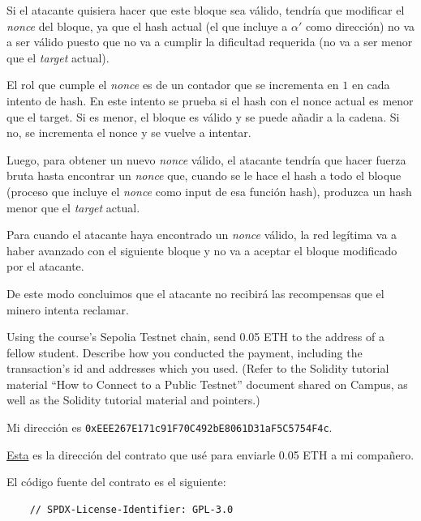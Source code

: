 \documentclass[12pt,addpoints,answers]{exam}
\begin{document}
\begin{questions}
\begin{solution}
    Si el atacante quisiera hacer que este bloque sea válido, tendría que modificar el
    \textit{nonce} del bloque, ya que el hash actual (el que incluye a $\alpha'$ como dirección) 
    no va a ser válido puesto que no va a cumplir la dificultad requerida
    (no va a ser menor que el \textit{target} actual).
        
    El rol que cumple el \textit{nonce} es de un contador que se incrementa en $1$ en cada intento
    de hash. En este intento se prueba si el hash con el nonce actual es menor que el target.
    Si es menor, el bloque es válido y se puede añadir a la cadena. Si no, se incrementa el nonce
    y se vuelve a intentar.

    Luego, para obtener un nuevo \textit{nonce} válido, el atacante tendría que hacer fuerza bruta
    hasta encontrar un \textit{nonce} que, cuando se le hace el hash a todo el bloque (proceso que
    incluye el \textit{nonce} como input de esa función hash), produzca un hash menor que el 
    \textit{target} actual.
    
    Para cuando el atacante haya encontrado un \textit{nonce} válido, la red legítima va a haber 
    avanzado con el siguiente bloque y no va a aceptar el bloque modificado por el atacante.

    De este modo concluimos que el atacante no recibirá las recompensas que el minero intenta reclamar.

\end{solution}

\newpage

\question[10] Using the course’s Sepolia  Testnet chain, send 0.05 ETH to the address of a fellow student. Describe how you conducted the payment, including the transaction’s id and addresses which you used. (Refer to the Solidity tutorial material “How to Connect
to a Public Testnet” document shared on Campus, as well as the Solidity
tutorial material and pointers.) 

\begin{solution} %
   Mi dirección es {\footnotesize\texttt{0xEEE267E171c91F70C492bE8061D31aF5C5754F4c}}.

   \href{https://sepolia.etherscan.io/address/0x7F34Ef9C850b48FBD7C8c7B8EEf46C29Efc36eA4}{Esta} es la dirección del contrato que usé para enviarle 0.05 ETH a mi compañero.

   El código fuente del contrato es el siguiente:
   \begin{verbatim}
    // SPDX-License-Identifier: GPL-3.0


\end{verbatim}
\end{solution}
\end{questions}
\end{document}
